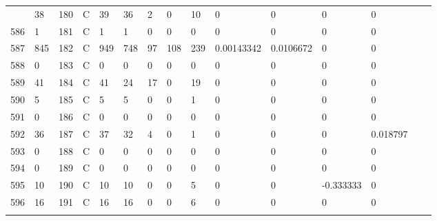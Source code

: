 \begin{longtable}{lllllllllllllll}
\begin{comment}
	585 & 38                & 180 & C   & 39                & 36                & 2                 & 0    & 10         & 0              & 0              & 0             & 0            \\
	586 & 1                 & 181 & C   & 1                 & 1                 & 0                 & 0    & 0          & 0              & 0              & 0             & 0            \\
	587 & 845               & 182 & C   & 949               & 748               & 97                & 108  & 239        & 0.00143342     & 0.0106672      & 0             & 0            \\
	588 & 0                 & 183 & C   & 0                 & 0                 & 0                 & 0    & 0          & 0              & 0              & 0             & 0            \\
	589 & 41                & 184 & C   & 41                & 24                & 17                & 0    & 19         & 0              & 0              & 0             & 0            \\
	590 & 5                 & 185 & C   & 5                 & 5                 & 0                 & 0    & 1          & 0              & 0              & 0             & 0            \\
	591 & 0                 & 186 & C   & 0                 & 0                 & 0                 & 0    & 0          & 0              & 0              & 0             & 0            \\
	592 & 36                & 187 & C   & 37                & 32                & 4                 & 0    & 1          & 0              & 0              & 0             & 0.018797     \\
	593 & 0                 & 188 & C   & 0                 & 0                 & 0                 & 0    & 0          & 0              & 0              & 0             & 0            \\
	594 & 0                 & 189 & C   & 0                 & 0                 & 0                 & 0    & 0          & 0              & 0              & 0             & 0            \\
	595 & 10                & 190 & C   & 10                & 10                & 0                 & 0    & 5          & 0              & 0              & -0.333333     & 0            \\
	596 & 16                & 191 & C   & 16                & 16                & 0                 & 0    & 6          & 0              & 0              & 0             & 0            \\

\end{comment}
\end{longtable}
